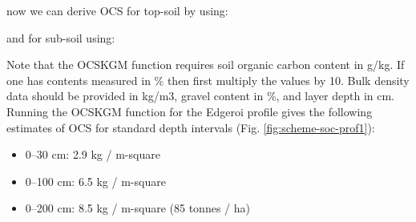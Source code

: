 \documentclass[graybox,natbib,nospthms,UStrade]{svmono}
\newenvironment{Shaded}{\begin{snugshade}}{\end{snugshade}}
\newcommand{\CommentTok}[1]{\textcolor[rgb]{0.37,0.37,0.37}{\textit{#1}}}
\newcommand{\DataTypeTok}[1]{\textcolor[rgb]{0.27,0.27,0.27}{#1}}
\newcommand{\DecValTok}[1]{\textcolor[rgb]{0.06,0.06,0.06}{#1}}
\newcommand{\KeywordTok}[1]{\textcolor[rgb]{0.27,0.27,0.27}{\textbf{#1}}}
\newcommand{\NormalTok}[1]{#1}
\newcommand{\OperatorTok}[1]{\textcolor[rgb]{0.43,0.43,0.43}{\textbf{#1}}}
\newcommand{\StringTok}[1]{\textcolor[rgb]{0.5,0.5,0.5}{#1}}
\begin{document}
now we can derive OCS for top-soil by using:

\begin{Shaded}
\end{Shaded}

and for sub-soil using:

\begin{Shaded}
\end{Shaded}

Note that the OCSKGM function requires soil organic carbon content in g/kg. If one has contents measured in \% then first multiply the values by 10. Bulk density data should be provided in kg/m3, gravel content in \%, and layer depth in cm. Running the OCSKGM function for the Edgeroi profile gives the following estimates of OCS for standard depth intervals (Fig. \ref{fig:scheme-soc-prof1}):

\begin{itemize}
\item
  0--30 cm: 2.9 kg / m-square
\item
  0--100 cm: 6.5 kg / m-square
\item
  0--200 cm: 8.5 kg / m-square (85 tonnes / ha)
\end{itemize}
\end{document}
